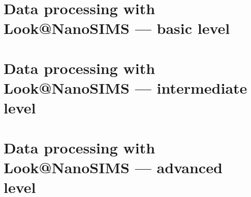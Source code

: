 \documentclass[a4paper, 11pt]{article}
\begin{document}
\section{Data processing with Look@NanoSIMS --- basic level}
\label{sec:level1}


\section{Data processing with Look@NanoSIMS --- intermediate level}
\label{sec:level2}


\section{Data processing with Look@NanoSIMS --- advanced level}
\label{sec:level3}
\end{document}
